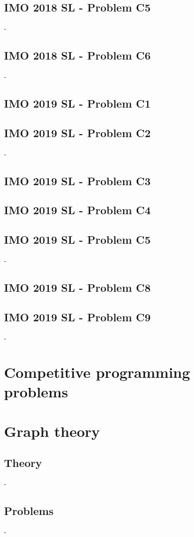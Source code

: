 \documentclass[12pt,openany,oneside]{book}
\theoremstyle{definition}
\numberwithin{definition}{section}
\numberwithin{theorem}{section}
\numberwithin{corollary}{section}
\numberwithin{proposition}{section}
\numberwithin{notation}{section}
\numberwithin{remark}{section}
\numberwithin{hypothesis}{section}
\numberwithin{example}{section}
\begin{document}
\section{IMO 2018 SL - Problem C5}-
\section{IMO 2018 SL - Problem C6}-

\section{IMO 2019 SL - Problem C1}

\section{IMO 2019 SL - Problem C2}-
\section{IMO 2019 SL - Problem C3}

\section{IMO 2019 SL - Problem C4}

\section{IMO 2019 SL - Problem C5}-
\section{IMO 2019 SL - Problem C8}

\section{IMO 2019 SL - Problem C9}-

\chapter{Competitive programming problems}

\chapter{Graph theory}
\section{Theory}-
\section{Problems}-



\end{document}
